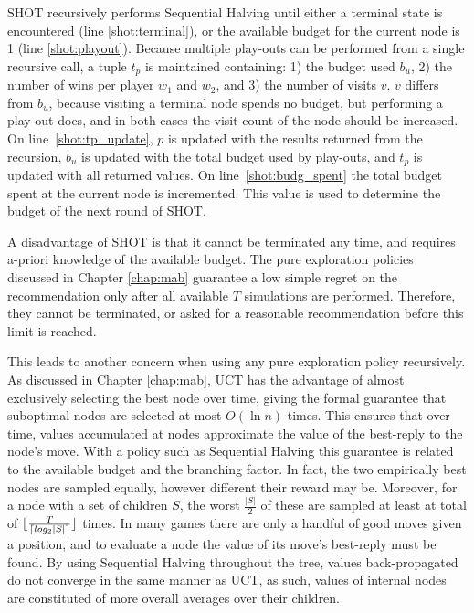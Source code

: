 \documentclass{kecsmstr}
\DeclarePairedDelimiter{\ceil}{\lceil}{\rceil}
\DeclarePairedDelimiter{\floor}{\lfloor}{\rfloor}
\begin{document}
\newpage
SHOT recursively performs Sequential Halving until either a terminal state is encountered (line \ref{shot:terminal}), or the available budget for the current node is 1 (line \ref{shot:playout}). Because multiple play-outs can be performed from a single recursive call, a tuple $t_p$ is maintained containing: 1) the budget used $b_u$, 2) the number of wins per player $w_1$ and $w_2$, and 3) the number of visits $v$. $v$ differs from $b_u$, because visiting a terminal node spends no budget, but performing a play-out does, and in both cases the visit count of the node should be increased. On line~\ref{shot:tp_update}, $p$ is updated with the results returned from the recursion, $b_u$ is updated with the total budget used by play-outs, and $t_p$ is updated with all returned values. On line~\ref{shot:budg_spent} the total budget spent at the current node is incremented. This value is used to determine the budget of the next round of SHOT.

A disadvantage of SHOT is that it cannot be terminated any time, and requires a-priori knowledge of the available budget. The pure exploration policies discussed in Chapter \ref{chap:mab} guarantee a low simple regret on the recommendation only after all available $T$ simulations are performed. Therefore, they cannot be terminated, or asked for a reasonable recommendation before this limit is reached.

This leads to another concern when using any pure exploration policy recursively. As discussed in Chapter \ref{chap:mab}, UCT has the advantage of almost exclusively selecting the best node over time, giving the formal guarantee that suboptimal nodes are selected at most $O(\ln{n})$ times. This ensures that over time, values accumulated at nodes approximate the value of the best-reply to the node's move. With a policy such as Sequential Halving this guarantee is related to the available budget and the branching factor. In fact, the two empirically best nodes are sampled equally, however different their reward may be. Moreover, for a node with a set of children $S$, the worst $\frac{|S|}{2}$ of these are sampled at least at total of $\floor{\frac{T}{\ceil{log_2{|S|}}}}$ times. In many games there are only a handful of good moves given a position, and to evaluate a node the value of its move's best-reply must be found. By using Sequential Halving throughout the tree, values back-propagated do not converge in the same manner as UCT, as such, values of internal nodes are constituted of more overall averages over their children.
\end{document}
